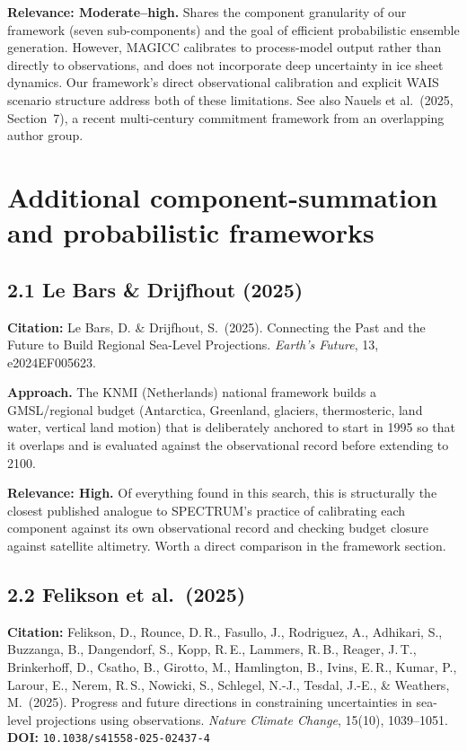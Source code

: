 \documentclass[11pt]{article}
\begin{document}
\noindent\textbf{Relevance: Moderate--high.} Shares the component
granularity of our framework (seven sub-components) and the goal of
efficient probabilistic ensemble generation. However, MAGICC calibrates to
process-model output rather than directly to observations, and does not
incorporate deep uncertainty in ice sheet dynamics. Our framework's direct
observational calibration and explicit WAIS scenario structure address both
of these limitations. See also Nauels et al.\ (2025, Section~7), a recent
multi-century commitment framework from an overlapping author group.

\section{Additional component-summation and probabilistic frameworks}

\subsection*{2.1 Le Bars \& Drijfhout (2025)}

\noindent\textbf{Citation:} Le Bars, D. \& Drijfhout, S.\ (2025). Connecting
the Past and the Future to Build Regional Sea-Level Projections.
\textit{Earth's Future}, 13, e2024EF005623.

\noindent\textbf{Approach.} The KNMI (Netherlands) national framework builds
a GMSL/regional budget (Antarctica, Greenland, glaciers, thermosteric, land
water, vertical land motion) that is deliberately anchored to start in 1995
so that it overlaps and is evaluated against the observational record before
extending to 2100.

\noindent\textbf{Relevance: High.} Of everything found in this search, this
is structurally the closest published analogue to SPECTRUM's practice of
calibrating each component against its own observational record and
checking budget closure against satellite altimetry. Worth a direct
comparison in the framework section.

\subsection*{2.2 Felikson et al.\ (2025)}

\noindent\textbf{Citation:} Felikson, D., Rounce, D.\,R., Fasullo, J.,
Rodriguez, A., Adhikari, S., Buzzanga, B., Dangendorf, S., Kopp, R.\,E.,
Lammers, R.\,B., Reager, J.\,T., Brinkerhoff, D., Csatho, B., Girotto, M.,
Hamlington, B., Ivins, E.\,R., Kumar, P., Larour, E., Nerem, R.\,S.,
Nowicki, S., Schlegel, N.-J., Tesdal, J.-E., \& Weathers, M.\ (2025).
Progress and future directions in constraining uncertainties in
sea-level projections using observations.
\textit{Nature Climate Change}, 15(10), 1039--1051.\\
\textbf{DOI:} \texttt{10.1038/s41558-025-02437-4}
\end{document}
